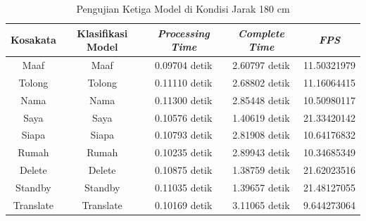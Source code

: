 \begin{longtable}{|c|c|c|c|c|}
  \caption{Pengujian Ketiga Model di Kondisi Jarak 180 cm}
  \label{tb:prediksipendek3}                                   \\
  \hline
  \rowcolor[HTML]{C0C0C0}
  \textbf{Kosakata} & \textbf{Klasifikasi Model} & \textbf{\emph{Processing Time}} & \textbf{\emph{Complete Time}} & \textbf{\emph{FPS}}\\
  \hline
  Maaf              & Maaf                          & 0.09704 detik                           & 2.60797 detik                                 & 11.50321979\\
  Tolong            & Tolong                        & 0.11110 detik                           & 2.68802 detik                                 & 11.16064415\\
  Nama              & Nama                          & 0.11300 detik                           & 2.85448 detik                                 & 10.50980117\\
  Saya              & Saya                          & 0.10576 detik                           & 1.40619 detik                                 & 21.33420142\\
  Siapa             & Siapa                         & 0.10793 detik                           & 2.81908 detik                                 & 10.64176832\\
  Rumah             & Rumah                         & 0.10235 detik                           & 2.89943 detik                                 & 10.34685349\\
  Delete            & Delete                        & 0.10875 detik                           & 1.38759 detik                                 & 21.62023516\\
  Standby           & Standby                       & 0.11035 detik                           & 1.39657 detik                                 & 21.48127055\\
  Translate         & Translate                     & 0.10169 detik                           & 3.11065 detik                                 & 9.644273064\\
  \hline
\end{longtable}


